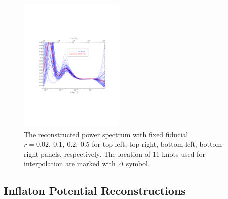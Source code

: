 \documentclass[11pt]{article}
\def \halffigwidth{0.45\textwidth}
\begin{document}
\begin{figure}
  \includegraphics[width=\halffigwidth,  trim = 1in 3in 1in 3in]{nobicep_spline0_p11_r0d5_eps_traj.pdf}
  \caption{The reconstructed power spectrum with fixed fiducial $r = 0.02,\ 0.1,\ 0.2,\ 0.5$ for top-left, top-right, bottom-left, bottom-right panels, respectively. The location of 11 knots used for interpolation are marked with $\Delta$ symbol. \label{fig:traj_eps_fixr}}
\end{figure}


\subsection{Inflaton Potential Reconstructions}
\end{document}
